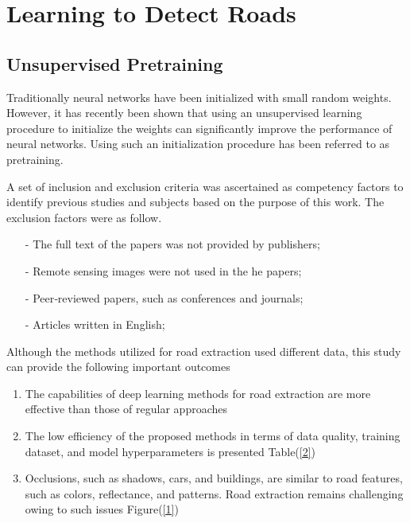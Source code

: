\documentclass[acmlarge]{acmart}
\begin{document}
\tableofcontents
\newpage
\section{Learning to Detect Roads}
\subsection{Unsupervised Pretraining}  

\raggedright Traditionally neural networks have been initialized with small random weights. However, it has recently been shown that using an unsupervised learning procedure to initialize the weights can significantly improve the performance of neural networks. Using such an initialization procedure has been referred to as pretraining.
\newline

\raggedright A  set  of  inclusion  and  exclusion  criteria  was  ascertained  as  competency  factors  to  identify  previous  studies  and  subjects  based  on  the  purpose  of  this  work.  The exclusion factors  were as follow.
\noindent

\begin{itemize}
    \item[-] The full text of the papers was not provided by publishers;
    \item[-] Remote sensing images were not used in the he papers;
    \item[-] Peer‐reviewed papers, such as conferences and journals;
    \item[-] Articles written in English;
\end{itemize}

\raggedright Although the methods utilized for road extraction used different data, this study can provide the following important outcomes 

\noindent
\begin{enumerate}
\item The capabilities of deep learning methods for road extraction are more effective than those of regular approaches
\item The low efficiency of the proposed methods in terms of data quality, training dataset, and model hyperparameters is presented Table(\ref{2})
\item Occlusions, such as shadows, cars, and buildings, are similar to road features, such as colors, reflectance, and patterns. Road extraction remains challenging owing to such issues Figure(\ref{1})
\end{enumerate}
\end{document}
